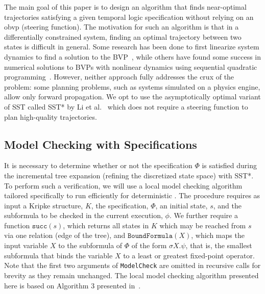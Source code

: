 The main goal of this paper is to design an algorithm that finds near-optimal trajectories satisfying a given temporal logic specification without relying on an \gls{obvp} (steering function). The motivation for such an algorithm is that in a differentially constrained system, finding an optimal trajectory between two states is difficult in general. Some research has been done to first linearize system dynamics to find a solution to the BVP~\cite{Webb2013}, while others have found some success in numerical solutions to BVPs with nonlinear dynamics using sequential quadratic programming~\cite{Xie2015}. However, neither approach fully addresses the crux of the problem: some planning problems, such as systems simulated on a physics engine, allow only forward propagation. We opt to use the asymptotically optimal variant of SST called SST* by Li et al.~\cite{Li2016} which does not require a steering function to plan high-quality trajectories.


\subsection{\texorpdfstring{Model Checking with \muCalc{} Specifications}
                           {Model Checking with mu-Calculus Specifications}}

It is necessary to determine whether or not the \mucalc{} specification $\Phi$ is satisfied during the incremental tree expansion (refining the discretized state space) with SST*. To perform such a verification, we will use a local model checking algorithm tailored specifically to run efficiently for deterministic \mucalc{}. The procedure requires as input a Kripke structure, $K$, the \mucalc{} specification, $\Phi$, an initial state, $s$, and the subformula to be checked in the current execution, $\phi$. We further require a function $\texttt{succ}(s)$, which returns all states in $K$ which may be reached from $s$ via one relation (edge of the tree), and $\texttt{BoundFormula}(X)$, which maps the input variable $X$ to the subformula of $\Phi$ of the form $\sigma X.\psi$, that is, the smallest subformula that binds the variable $X$ to a least or greatest fixed-point operator. Note that the first two arguments of \texttt{ModelCheck} are omitted in recursive calls for brevity as they remain unchanged. The local model checking algorithm presented here is based on Algorithm 3 presented in~\cite{Karaman2009}.

